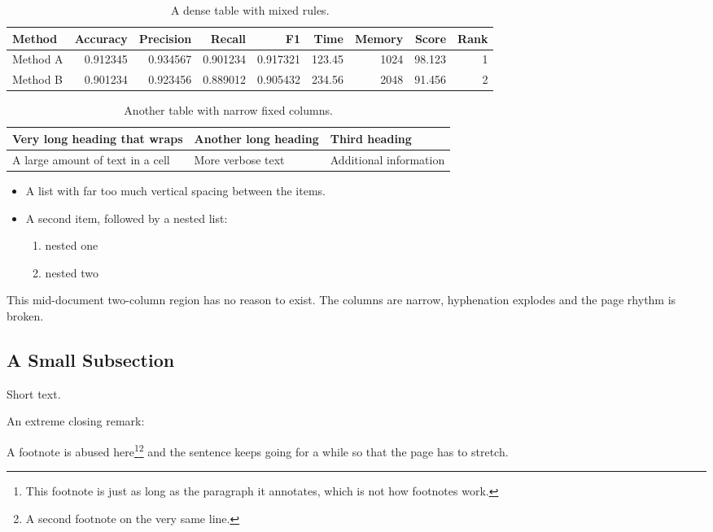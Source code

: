 \documentclass[10pt,a4paper,fleqn]{article}
\begin{document}
\begin{table}[!ht]\centering
\caption{A dense table with mixed rules.}
\begin{tabular}{lrrrrrrrr}\hline
Method & Accuracy & Precision & Recall & F1 & Time & Memory & Score & Rank\\\hline
Method A & 0.912345 & 0.934567 & 0.901234 & 0.917321 & 123.45 & 1024 & 98.123 & 1 \\\toprule
Method B & 0.901234 & 0.923456 & 0.889012 & 0.905432 & 234.56 & 2048 & 91.456 & 2 \\\bottomrule
\end{tabular}
\end{table}
\begin{table}[!ht]\centering
\caption{Another table with narrow fixed columns.}
\begin{tabular}{p{2.0cm}p{2.0cm}p{2.0cm}}
\hline Very long heading that wraps & Another long heading & Third heading \\\hline
A large amount of text in a cell & More verbose text & Additional information \\\hline
\end{tabular}
\end{table}

\begin{itemize}[leftmargin=1pt,itemsep=18pt,topsep=16pt]
\item A list with far too much vertical spacing between the items.
\item A second item, followed by a nested list:
\begin{enumerate}[itemsep=12pt]\item nested one\item nested two\end{enumerate}
\end{itemize}

\begin{multicols}{2}
This mid-document two-column region has no reason to exist. The columns are
narrow, hyphenation explodes and the page rhythm is broken.
\subsection{A Small Subsection} Short text.
\end{multicols}

An extreme closing remark: \hfill \vfill

A footnote is abused here\footnote{This footnote is just as long as the
paragraph it annotates, which is not how footnotes work.}\footnote{A second
footnote on the very same line.} and the sentence keeps going for a while so
that the page has to stretch.
\end{document}
